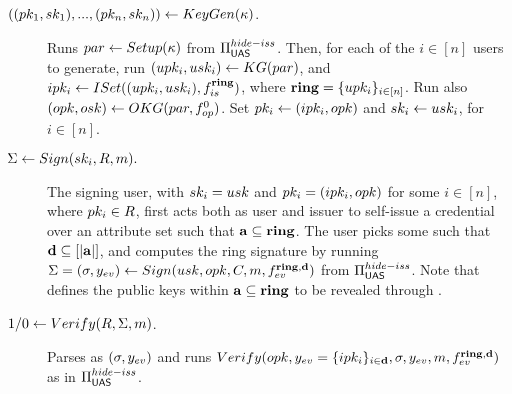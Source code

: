

\begin{description}
\item[$((pk_1,sk_1),...,(pk_n,sk_n)) \gets KeyGen(\kappa)$.] Runs
  $par \gets Setup(\kappa)$ from $\Pi_{\mathsf{UAS}}^{hide-iss}$. Then, for each of
  the $i \in [n]$ users to generate, run $(upk_i,usk_i) \gets KG(par)$,
  and $ipk_i \gets ISet((upk_i,usk_i),f_{is}^{\mathbf{ring}})$, where $\mathbf{ring} =
  \lbrace upk_i \rbrace_{i\in[n]}$. Run also $(opk,osk) \gets OKG(par,
  f_{op}^0)$. Set $pk_i \gets (ipk_i,opk)$ and $sk_i \gets usk_i$, for
  $i\in[n]$.
\item[$\Sigma \gets Sign(sk_i,R,m).$]
  The signing user, with $sk_i=usk$ and $pk_i=(ipk_i,opk)$ for some $i \in
  [n]$, where $pk_i \in R$, first acts both as user and issuer to self-issue a
  credential \Cred over an attribute set \attrs such that $\mathbf{a} \subseteq
  \mathbf{ring}$. The user picks some \dattrs such that $\mathbf{d} \subseteq [|\mathbf{a}|]$,
  and computes the ring signature by running $\Sigma = (\sigma,y_{ev}) \gets
  Sign(usk,opk,C,m,f_{ev}^{\mathbf{ring},\mathbf{d}})$ from
  $\Pi_{\mathsf{UAS}}^{hide-iss}$. Note that \dattrs defines the public keys within
  $\mathbf{a} \subseteq \mathbf{ring}$ to be revealed through \yeval.
\item[$1/0 \gets Verify(R,\Sigma,m)$.] Parses \Sig as $(\sigma,y_{ev})$ and
  runs $Verify(opk,y_{ev}=\lbrace ipk_i\rbrace_{i\in\mathbf{d}},\sigma,y_{ev},
  m,f_{ev}^{\mathbf{ring},\mathbf{d}})$ as in $\Pi_{\mathsf{UAS}}^{hide-iss}$.
\end{description}

